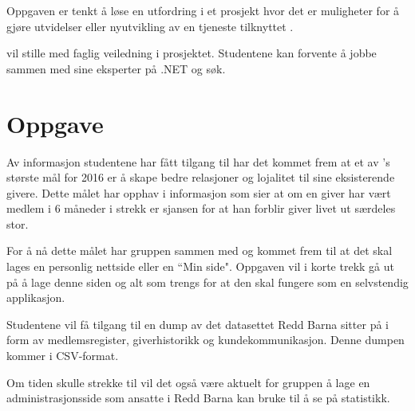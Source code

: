 Oppgaven er tenkt å løse en utfordring i et prosjekt hvor det er muligheter for å gjøre utvidelser eller nyutvikling av en tjeneste tilknyttet \rb{}.

\mw{} vil stille med faglig veiledning i prosjektet. Studentene kan forvente å jobbe sammen med \mw{} sine eksperter på .NET og søk.

\section{Oppgave}
Av informasjon studentene har fått tilgang til har det kommet frem at et av \rb{}'s største mål for 2016 er å skape bedre relasjoner og lojalitet til sine eksisterende givere. Dette målet har opphav i informasjon som sier at om en giver har vært medlem i 6 måneder i strekk er sjansen for at han forblir giver livet ut særdeles stor.

For å nå dette målet har gruppen sammen med \mw{} og \rb{} kommet frem til at det skal lages en personlig nettside eller en ``Min side". Oppgaven vil i korte trekk gå ut på å lage denne siden og alt som trengs for at den skal fungere som en selvstendig applikasjon.

Studentene vil få tilgang til en dump av det datasettet Redd Barna sitter på i form av medlemsregister, giverhistorikk og kundekommunikasjon. Denne dumpen kommer i CSV-format.

Om tiden skulle strekke til vil det også være aktuelt for gruppen å lage en administrasjonsside som ansatte i Redd Barna kan bruke til å se på statistikk.